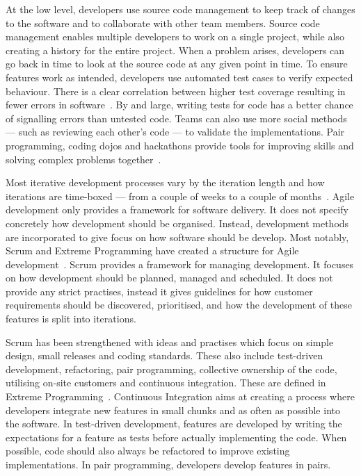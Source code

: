 \documentclass[english]{tktltiki2}
\begin{document}
At the low level, developers use source code management to keep track of changes to the software and to collaborate with other team members. Source code management enables multiple developers to work on a single project, while also creating a history for the entire project. When a problem arises, developers can go back in time to look at the source code at any given point in time. To ensure features work as intended, developers use automated test cases to verify expected behaviour. There is a clear correlation between higher test coverage resulting in fewer errors in software~\cite{MND09}. By and large, writing tests for code has a better chance of signalling errors than untested code. Teams can also use more social methods — such as reviewing each other’s code — to validate the implementations. Pair programming, coding dojos and hackathons provide tools for improving skills and solving complex problems together~\cite{DD08, HHL13, RKD13}.

Most iterative development processes vary by the iteration length and how iterations are time-boxed — from a couple of weeks to a couple of months~\cite{LB03}. Agile development only provides a framework for software delivery. It does not specify concretely how development should be organised. Instead, development methods are incorporated to give focus on how software should be develop. Most notably, Scrum and Extreme Programming have created a structure for Agile development~\cite{LB03, Fow05, SS10}. Scrum provides a framework for managing development. It focuses on how development should be planned, managed and scheduled. It does not provide any strict practises, instead it gives guidelines for how customer requirements should be discovered, prioritised, and how the development of these features is split into iterations.

Scrum has been strengthened with ideas and practises which focus on simple design, small releases and coding standards. These also include test-driven development, refactoring, pair programming, collective ownership of the code, utilising on-site customers and continuous integration. These are defined in Extreme Programming~\cite{Bec00}. Continuous Integration aims at creating a process where developers integrate new features in small chunks and as often as possible into the software. In test-driven development, features are developed by writing the expectations for a feature as tests before actually implementing the code. When possible, code should also always be refactored to improve existing implementations. In pair programming, developers develop features in pairs.
\end{document}
